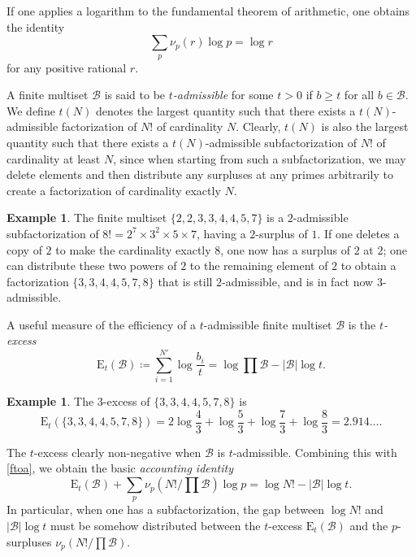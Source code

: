 \documentclass[12pt,a4paper,reqno]{amsart}
\numberwithin{equation}{section}
\theoremstyle{plain}
\theoremstyle{definition}
\newtheorem{example}[theorem]{Example}
\newcommand\tuple{{\mathcal B}}
\newcommand\excess{{\mathrm{E}}}
\begin{document}
If one applies a logarithm to the fundamental theorem of arithmetic, one obtains the identity
\begin{equation}\label{ftoa}
  \sum_p \nu_p(r) \log p = \log r
\end{equation}
for any positive rational $r$.

A finite multiset $\tuple$ is said to be \emph{$t$-admissible} for some $t>0$ if $b \geq t$ for all $b \in \tuple$.  We define $t(N)$ denotes the largest quantity such that there exists a $t(N)$-admissible factorization of $N!$ of cardinality $N$.  Clearly, $t(N)$ is also the largest quantity such that there exists a $t(N)$-admissible subfactorization of $N!$ of cardinality at least $N$, since when starting from such a subfactorization, we may delete elements and then distribute any surpluses at any primes arbitrarily to create a factorization of cardinality exactly $N$.

\begin{example}  The finite multiset $\{2,2,3,3,4,4,5,7\}$ is a $2$-admissible subfactorization of $8! = 2^7 \times 3^2 \times 5 \times 7$, having a $2$-surplus of $1$. If one deletes a copy of $2$ to make the cardinality exactly $8$, one now has a surplus of $2$ at $2$; one can distribute these two powers of $2$ to the remaining element of $2$ to obtain a factorization $\{ 3,3,4,4,5,7,8\}$ that is still $2$-admissible, and is in fact now $3$-admissible.
\end{example}

A useful measure of the efficiency of a $t$-admissible finite multiset $\tuple$ is the \emph{$t$-excess}
$$ \excess_t(\tuple) \coloneqq \sum_{i=1}^{N'} \log \frac{b_i}{t}
= \log \prod \tuple - |\tuple| \log t.$$

\begin{example}  The $3$-excess of $\{ 3,3,4,4,5,7,8\}$ is
$$ \excess_t(\{3,3,4,4,5,7,8\}) = 2 \log \frac{4}{3}  + \log \frac{5}{3} + \log \frac{7}{3} + \log \frac{8}{3} = 2.914\dots.$$
\end{example}

The $t$-excess clearly non-negative when $\tuple$ is $t$-admissible.
Combining this with \eqref{ftoa}, we obtain the basic \emph{accounting identity}
\begin{equation}\label{excess-identity}
\excess_t(\tuple) + \sum_p \nu_p(N!/\prod\tuple) \log p = \log N! - |\tuple| \log t.
\end{equation}
In particular, when one has a subfactorization, the gap between $\log N!$ and $|\tuple| \log t$ must be somehow distributed between the $t$-excess $\excess_t(\tuple)$ and the $p$-surpluses $\nu_p(N!/\prod\tuple)$.  
\end{document}
